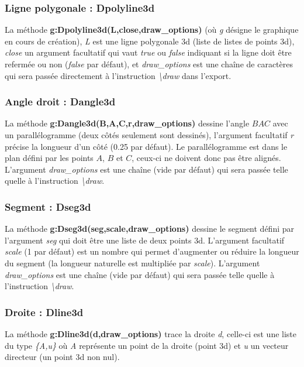 \subsubsection{Ligne polygonale : Dpolyline3d}

La méthode \textbf{g:Dpolyline3d(L,close,draw\_options)} (où \emph{g} désigne le graphique en cours de création), \emph{L} est une ligne polygonale 3d (liste de listes de points 3d), \emph{close} un argument facultatif qui vaut \emph{true} ou \emph{false} indiquant si la ligne doit être refermée ou non (\emph{false} par défaut), et \emph{draw\_options} est une chaîne de caractères qui sera passée directement à l'instruction \emph{\textbackslash draw} dans l'export.
    
\subsubsection{Angle droit : Dangle3d}

La méthode \textbf{g:Dangle3d(B,A,C,r,draw\_options)} dessine l'angle \(BAC\) avec un parallélogramme (deux côtés seulement sont dessinés), l'argument facultatif \emph{r} précise la longueur d'un côté (0.25 par défaut). Le parallélogramme est dans le plan défini par les points $A$, $B$ et $C$, ceux-ci ne doivent donc pas être alignés. L'argument \emph{draw\_options} est une chaîne (vide par défaut) qui sera passée telle quelle à l'instruction  \emph{\textbackslash draw}.
    
\subsubsection{Segment : Dseg3d}

La méthode \textbf{g:Dseg3d(seg,scale,draw\_options)} dessine le segment défini par l'argument \emph{seg} qui doit être une liste de deux points 3d. L'argument facultatif \emph{scale} (1 par défaut) est un nombre qui permet d'augmenter ou réduire la longueur du segment (la longueur naturelle est multipliée par \emph{scale}). L'argument \emph{draw\_options} est une chaîne (vide par défaut) qui sera passée telle quelle à l'instruction \emph{\textbackslash draw}.
    
\subsubsection{Droite : Dline3d}

La méthode \textbf{g:Dline3d(d,draw\_options)} trace la droite \emph{d}, celle-ci est une liste du type \emph{\{A,u\}} où \emph{A} représente un point de la droite (point 3d) et \emph{u} un vecteur directeur (un point 3d non nul). 

